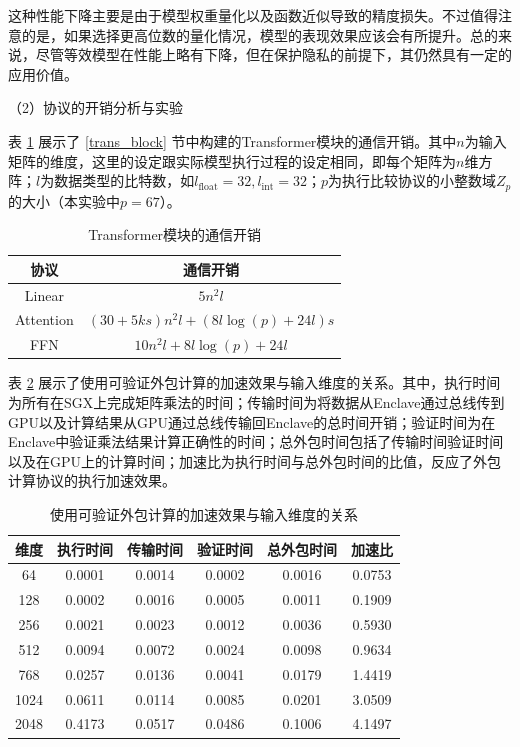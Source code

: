这种性能下降主要是由于模型权重量化以及函数近似导致的精度损失。不过值得注意的是，如果选择更高位数的量化情况，模型的表现效果应该会有所提升。总的来说，尽管等效模型在性能上略有下降，但在保护隐私的前提下，其仍然具有一定的应用价值。

（2）协议的开销分析与实验

表 \ref{communication_cost} 展示了 \ref{trans_block} 节中构建的Transformer模块的通信开销。其中$n$为输入矩阵的维度，这里的设定跟实际模型执行过程的设定相同，即每个矩阵为$n$维方阵；$l$为数据类型的比特数，如$l_{\text{float}}=32, l_{\text{int}}=32$；$p$为执行比较协议的小整数域$Z_p$的大小（本实验中$p=67$）。

\begin{table}[]
	\centering
	\caption{Transformer模块的通信开销}
	\begin{tabular}{|c|c|}
		\hline
		协议&通信开销
		\\ \hline
		Linear&$5n^2l$    \\ \hline
		Attention&$(30+5ks)n^2l+(8l\log(p)+24l)s$   \\ \hline
		FFN&$10n^2l+8l\log(p)+24l$   \\ \hline
		
	\end{tabular}
	\label{communication_cost}
\end{table}


表 \ref{Outsource} 展示了使用可验证外包计算的加速效果与输入维度的关系。其中，执行时间为所有在SGX上完成矩阵乘法的时间；传输时间为将数据从Enclave通过总线传到GPU以及计算结果从GPU通过总线传输回Enclave的总时间开销；验证时间为在Enclave中验证乘法结果计算正确性的时间；总外包时间包括了传输时间验证时间以及在GPU上的计算时间；加速比为执行时间与总外包时间的比值，反应了外包计算协议的执行加速效果。

\begin{table}[]
\centering
\caption{使用可验证外包计算的加速效果与输入维度的关系}
\begin{tabular}{|c|c|c|c|c|c|}
	\hline
	维度&执行时间&传输时间&验证时间&总外包时间&加速比
	   \\ \hline
	64&0.0001&0.0014&0.0002&0.0016&0.0753    \\ \hline
	128&0.0002&0.0016&0.0005&0.0011&0.1909    \\ \hline
	256&0.0021&0.0023&0.0012&0.0036&0.5930    \\ \hline
	512&0.0094&0.0072&0.0024&0.0098&0.9634    \\ \hline
	768&0.0257&0.0136&0.0041&0.0179&1.4419   \\ \hline
	1024&0.0611&0.0114&0.0085&0.0201&3.0509    \\ \hline
	2048&0.4173&0.0517&0.0486&0.1006&4.1497    \\ \hline
\end{tabular}
\label{Outsource}
\end{table}

